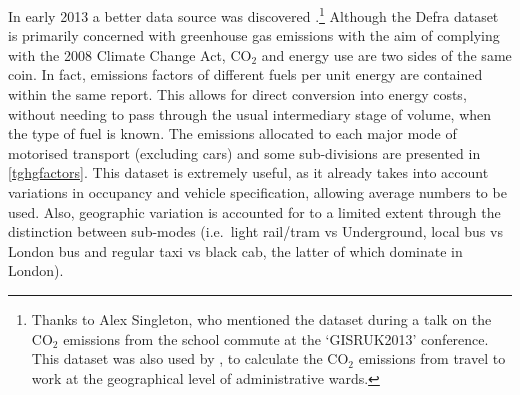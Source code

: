 In early 2013 a better data source was discovered
\citep{Defra2011}.\footnote{Thanks to Alex Singleton, who mentioned the dataset
during a talk on the CO$_2$ emissions from the school commute at the `GISRUK2013'
conference. This dataset was also used by \citet{smith2011polycentricity},
to calculate the CO$_2$ emissions from travel to work at the geographical
level of administrative wards.
}
Although the Defra dataset is primarily concerned with greenhouse gas
emissions with the aim of complying with the 2008 Climate Change Act,
CO$_2$ and energy use are two sides of the same coin. In fact,
emissions factors of different fuels per unit energy are contained within the
same report. This allows
for direct conversion into energy costs, without needing to pass
through the usual intermediary stage of volume, when the type of fuel is known.
The emissions allocated
to each major mode of motorised transport (excluding cars)
and some sub-divisions are presented in \cref{tghgfactors}.
This dataset is extremely useful, as it already takes into account
variations in occupancy and vehicle specification, allowing average numbers to be used.
Also, geographic variation
is accounted for to a limited extent through the distinction between sub-modes
(i.e.~light rail/tram vs Underground, local bus vs London bus and regular taxi
vs black cab, the latter of which dominate in London).

